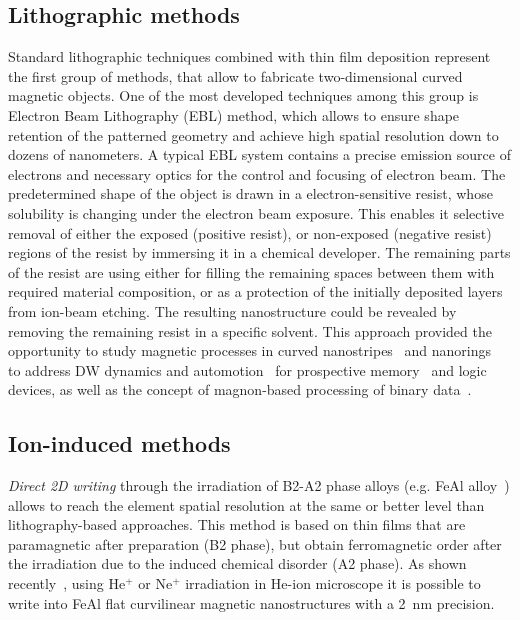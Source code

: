 \subsection{Lithographic methods}

Standard lithographic techniques combined with thin film deposition represent the first group of methods, that allow to fabricate two-dimensional curved magnetic objects. One of the most developed techniques among this group is Electron Beam Lithography (EBL) method, which allows to ensure shape retention of the patterned geometry and achieve high spatial resolution down to dozens of nanometers. A typical EBL system contains a precise emission source of electrons and necessary optics for the control and focusing of electron beam. The predetermined shape of the object is drawn in a electron-sensitive resist, whose solubility is changing under the electron beam exposure. This enables it selective removal of either the exposed (positive resist), or non-exposed (negative resist) regions of the resist by immersing it in a chemical developer. The remaining parts of the resist are using either for filling the remaining spaces between them with required material composition, or as a protection of the initially deposited layers from ion-beam etching. The resulting nanostructure could be revealed by removing the remaining resist in a specific solvent. This approach provided the opportunity to study magnetic processes in curved nanostripes~\cite{Lewis09,Nahrwold09,Glathe12} and nanorings~\cite{Klaui03a,Klaui05a,Klaui08,Richter16,Mawass17}  to address DW dynamics and automotion~\cite{Mawass17} for prospective memory~\cite{Hayashi07,Parkin08,Parkin15} and logic~\cite{Allwood02,Allwood04,Allwood05,Hrkac11} devices, as well as the concept of magnon-based processing of binary data~\cite{Schneider08,Lee08e,Vogt12,Vogt14,Chumak15}.


\subsection{Ion-induced methods}

\textit{Direct 2D writing} through the irradiation of B2-A2 phase alloys (e.g. FeAl alloy~\cite{Bali14}) allows to reach the element spatial resolution at the same or better level than lithography-based approaches. This method is based on thin films that are paramagnetic after preparation (B2 phase), but obtain ferromagnetic order after the irradiation due to the induced chemical disorder (A2 phase). As shown recently~\cite{Nord19}, using He$^{+}$ or Ne$^{+}$ irradiation in He-ion microscope it is possible to write into FeAl flat curvilinear magnetic nanostructures with a 2~nm precision.

